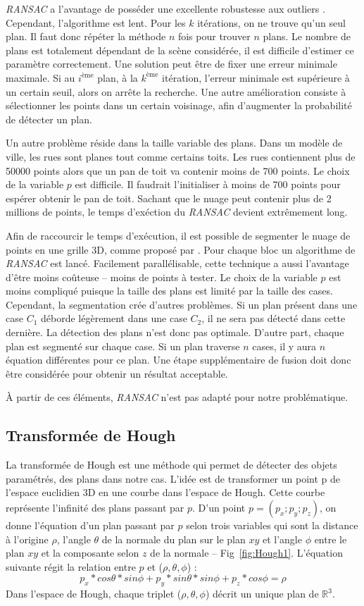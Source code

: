 ﻿\documentclass[12pt, twoside]{article}
\begin{document}
\textit{RANSAC} a l’avantage de posséder une excellente robustesse aux outliers \cite{RANSAC1}. Cependant, l’algorithme est lent. Pour les $k$ itérations, on ne trouve qu’un seul plan. Il faut donc répéter la méthode $n$ fois pour trouver $n$ plans. Le nombre de plans est totalement dépendant de la scène considérée, il est difficile d’estimer ce paramètre correctement. Une solution peut être de fixer une erreur minimale maximale. Si au $i^\text{ème}$ plan, à la $k^\text{ème}$ itération, l’erreur minimale est supérieure à un certain seuil, alors on arrête la recherche. Une autre amélioration consiste à sélectionner les points dans un certain voisinage, afin d’augmenter la probabilité de détecter un plan.

Un autre problème réside dans la taille variable des plans. Dans un modèle de ville, les rues sont planes tout comme certains toits. Les rues contiennent plus de 50000 points alors que un pan de toit va contenir moins de 700 points. Le choix de la variable $p$ est difficile. Il faudrait l'initialiser à moins de 700 points pour espérer obtenir le pan de toit. Sachant que le nuage peut contenir plus de 2 millions de points, le temps d'exéction du \textit{RANSAC} devient extrêmement long.

Afin de raccourcir le temps d'exécution, il est possible de segmenter le nuage de points en une grille 3D, comme proposé par \cite{RANSAC2}. Pour chaque bloc un algorithme de \textit{RANSAC} est lancé. Facilement parallélisable, cette technique a aussi l'avantage d'être moins coûteuse -- moins de points à tester. Le choix de la variable $p$ est moins compliqué puisque la taille des plans est limité par la taille des cases. Cependant, la segmentation crée d'autres problèmes. Si un plan présent dans une case $C_1$ déborde légèrement dans une case $C_2$, il ne sera pas détecté dans cette dernière. La détection des plans n'est donc pas optimale. D'autre part, chaque plan est segmenté sur chaque case. Si un plan traverse $n$ cases, il y aura $n$ équation différentes pour ce plan. Une étape supplémentaire de fusion doit donc être considérée pour obtenir un résultat acceptable.

À partir de ces éléments, \textit{RANSAC} n'est pas adapté pour notre problématique.

\subsection{Transformée de Hough}
La transformée de Hough est une méthode qui permet de détecter des objets paramétrés, des plans dans notre cas. L’idée est de transformer un point p de l’espace euclidien 3D en une courbe dans l’espace de Hough. Cette courbe représente l’infinité des plans passant par $p$. D’un point $p = (p_x; p_y; p_z)$, on donne l’équation d’un plan passant par $p$ selon trois variables qui sont la distance à l’origine $\rho$, l’angle $\theta$ de la normale du plan sur le plan $xy$ et l’angle $\phi$ entre le plan $xy$ et la composante selon $z$ de la normale -- Fig~\ref{fig:Hough1}. L’équation suivante régit la relation entre $p$ et ($\rho, \theta, \phi$) :
$$p_x*cos\theta * sin\phi + p_y*sin\theta*sin\phi + p_z*cos\phi = \rho$$
Dans l'espace de Hough, chaque triplet ($\rho, \theta, \phi$) décrit un unique plan de $\mathbb{R}^3$.
\end{document}
